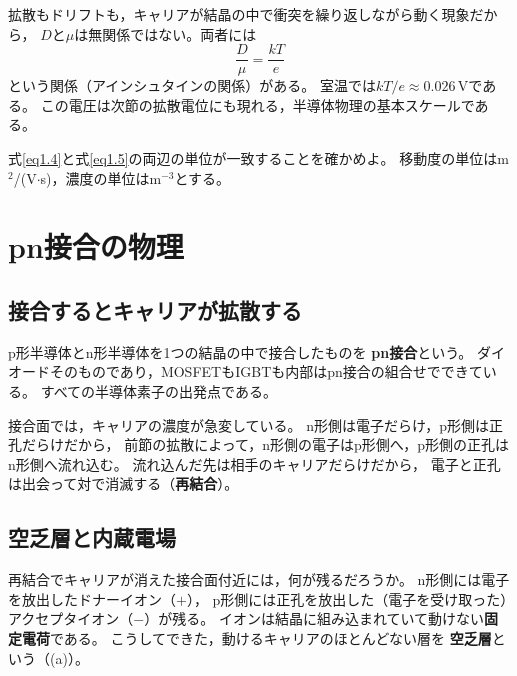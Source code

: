 拡散もドリフトも，キャリアが結晶の中で衝突を繰り返しながら動く現象だから，
$D$と$\mu$は無関係ではない。両者には
\begin{equation}
\frac{D}{\mu} = \frac{kT}{e}
\label{eq1.7}
\end{equation}
という関係（アインシュタインの関係）がある。
室温では$kT/e \approx 0.026$\,Vである。
この電圧は次節の拡散電位にも現れる，半導体物理の基本スケールである。

\begin{問}
\item 式\ref{eq1.4}と式\ref{eq1.5}の両辺の単位が一致することを確かめよ。
移動度の単位はm$^2$/(V$\cdot$s)，濃度の単位はm$^{-3}$とする。
\end{問}

\section{pn接合の物理}
\label{sec1.6}

\subsection{接合するとキャリアが拡散する}

p形半導体とn形半導体を1つの結晶の中で接合したものを
\textbf{pn接合}という。
ダイオードそのものであり，MOSFETもIGBTも内部はpn接合の組合せでできている。
すべての半導体素子の出発点である。

接合面では，キャリアの濃度が急変している。
n形側は電子だらけ，p形側は正孔だらけだから，
前節の拡散によって，n形側の電子はp形側へ，p形側の正孔はn形側へ流れ込む。
流れ込んだ先は相手のキャリアだらけだから，
電子と正孔は出会って対で消滅する（\textbf{再結合}）。

\subsection{空乏層と内蔵電場}

再結合でキャリアが消えた接合面付近には，何が残るだろうか。
n形側には電子を放出したドナーイオン（$+$），
p形側には正孔を放出した（電子を受け取った）アクセプタイオン（$-$）が残る。
イオンは結晶に組み込まれていて動けない\textbf{固定電荷}である。
こうしてできた，動けるキャリアのほとんどない層を
\textbf{空乏層}という（(a)）。

